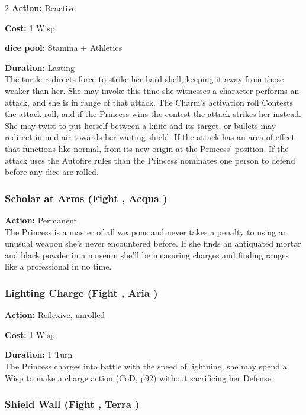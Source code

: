 \begin{multicols}{2}
\noindent \textbf{Action:} Reactive

\noindent \textbf{Cost:} 1 Wisp

\noindent \textbf{dice pool:} Stamina + Athletics

\noindent \textbf{Duration:} Lasting\\

\noindent The turtle redirects force to strike her hard shell, keeping it away from those weaker than her. She may invoke this time she witnesses a character performs an attack, and she is in range of that attack. The Charm's activation roll Contests the attack roll, and if the Princess wins the contest the attack strikes her instead. She may twist to put herself between a knife and its target, or bullets may redirect in mid-air towards her waiting shield. If the attack has an area of effect that functions like normal, from its new origin at the Princess' position. If the attack uses the Autofire rules than the Princess nominates one person to defend before any dice are rolled. 

\subsubsection*{Scholar at Arms (Fight \textbullet, Acqua \textbullet)}

\noindent \textbf{Action:} Permanent\\

\noindent The Princess is a master of all weapons and never takes a penalty to using an unusual weapon she's never encountered before. If she finds an antiquated mortar and black powder in a museum she'll be measuring charges and finding ranges like a professional in no time. 

\subsubsection*{Lighting Charge (Fight \textbullet, Aria \textbullet)}

\noindent \textbf{Action:} Reflexive, unrolled

\noindent \textbf{Cost:} 1 Wisp

\noindent \textbf{Duration:} 1 Turn\\

\noindent The Princess charges into battle with the speed of lightning, she may spend a Wisp to make a charge action (CoD, p92) without sacrificing her Defense.


\subsubsection*{Shield Wall (Fight \textbullet\textbullet, Terra \textbullet)}


\end{multicols}
